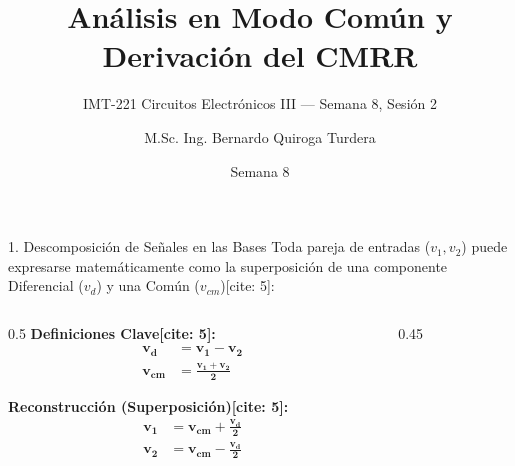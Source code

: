 \documentclass[aspectratio=169]{beamer}
\title[Modo Común y CMRR]{Análisis en Modo Común y Derivación del CMRR}
\subtitle{IMT-221 Circuitos Electrónicos III — Semana 8, Sesión 2}
\author[B. Quiroga Turdera]{M.Sc. Ing. Bernardo Quiroga Turdera}
\institute[UCB Tarija]{Universidad Católica Boliviana ``San Pablo'' — Sede Tarija}
\date{Semana 8}
\begin{document}
\begin{frame}
    \titlepage
\end{frame}

\begin{frame}{1. Descomposición de Señales en las Bases}
    Toda pareja de entradas ($v_1, v_2$) puede expresarse matemáticamente como la superposición de una componente Diferencial ($v_d$) y una Común ($v_{cm}$)[cite: 5]:
    
    \begin{columns}[c]
        \begin{column}{0.5\textwidth}
            \textbf{Definiciones Clave[cite: 5]:}
            \begin{align*}
                \bm{v_d} &= \bm{v_1 - v_2} \\
                \bm{v_{cm}} &= \bm{\frac{v_1 + v_2}{2}}
            \end{align*}
            
            \vspace{0.2cm}
            \textbf{Reconstrucción (Superposición)[cite: 5]:}
            \begin{align*}
                \bm{v_1} &= \bm{v_{cm} + \frac{v_d}{2}} \\
                \bm{v_2} &= \bm{v_{cm} - \frac{v_d}{2}}
            \end{align*}
        \end{column}
        \begin{column}{0.45\textwidth}
            \begin{center}
            \end{center}
        \end{column}
    \end{columns}
\end{frame}
\end{document}
